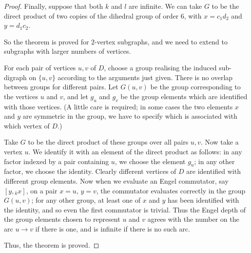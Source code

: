 \documentclass[10pt,a4paper]{amsart}
\begin{document}
\begin{proof}
Finally, suppose that both $k$ and $l$ are infinite. We can take $G$ to be
the direct product of two copies of the dihedral group of order $6$, with 
$x=c_1d_2$ and $y=d_1c_2$.

\medskip

So the theorem is proved for $2$-vertex subgraphs, and we need to extend to
subgraphs with larger numbers of vertices.

For each pair of vertices $u,v$ of $D$, choose a group realising the induced
sub-digraph on $\{u,v\}$ according to the arguments just given. There is no
overlap between groups for different pairs. Let $G(u,v)$ be the group
corresponding to the vertices $u$ and $v$, and let $g_u$ and $g_v$ be the
group elements which are identified with those vertices. (A little care is
required; in some cases the two elements $x$ and $y$ are symmetric in the
group, we have to specify which is associated with which vertex of $D$.)

Take $G$ to be the direct product of these groups over all pairs $u,v$. Now
take a vertex $u$.  We identify it with an element of the direct product as
follows: in any factor indexed by a pair containing $u$, we choose the element
$g_u$; in any other factor, we choose the identity. Clearly different vertices
of $D$ are identified with different group elements. Now when we evaluate an
Engel commutator, say $[y,{}_kx]$, on a pair $x=u$, $y=v$, the commutator
evaluates correctly in the group $G(u,v)$; for any other group, at least one
of $x$ and $y$ has been identified with the identity, and so even the first
commutator is trivial. Thus the Engel depth of the group elements chosen to
represent $u$ and $v$ agrees with the number on the arc $u\to v$ if there is
one, and is infinite if there is no such arc.

Thus, the theorem is proved.
\end{proof}
\end{document}

